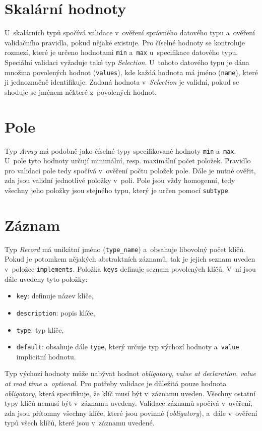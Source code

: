 \documentclass[FM,MP]{tulthesis}
\begin{document}
	\section{Skalární hodnoty}
		U~skalárních typů spočívá validace v~ověření správného datového typu a~ověření validačního pravidla, pokud nějaké existuje. Pro číselné hodnoty se kontroluje rozmezí, které je určeno hodnotami \texttt{min} a~\texttt{max} u~specifikace datového typu. Speciální validaci vyžaduje také typ \textit{Selection}. U~tohoto datového typu je dána množina povolených hodnot (\texttt{values}), kde každá hodnota má jméno (\texttt{name}), které ji jednoznačně identifikuje. Zadaná hodnota v~\textit{Selection} je validní, pokud se shoduje se jménem některé z~povolených hodnot.

	\section{Pole}
		Typ \textit{Array} má podobně jako číselné typy specifikované hodnoty \texttt{min} a~\texttt{max}. U~pole tyto hodnoty určují minimální, resp. maximální počet položek. Pravidlo pro validaci pole tedy spočívá v~ověření počtu položek pole. Dále je nutné ověřit, zda jsou validní jednotlivé položky v~poli. Pole jsou vždy homogenní, tedy všechny jeho položky jsou stejného typu, který je určen pomocí \texttt{subtype}.

	\section{Záznam}
		\label{struktura-zaznam}
		Typ \textit{Record} má unikátní jméno (\texttt{type\_name}) a~obsahuje libovolný počet klíčů. Pokud je potomkem nějakých abstraktních záznamů, tak je jejich seznam uveden v~položce \texttt{implements}. Položka \texttt{keys} definuje seznam povolených klíčů. V~ní jsou dále uvedeny tyto položky:
		\begin{itemize}
			\item \texttt{key}: definuje název klíče,
			\item \texttt{description}: popis klíče,
			\item \texttt{type}: typ klíče,
			\item \texttt{default}: obsahuje dále \texttt{type}, který určuje typ výchozí hodnoty a~\texttt{value} implicitní hodnotu.
		\end{itemize}

		Typ výchozí hodnoty může nabývat hodnot \textit{obligatory}, \textit{value at declaration}, \textit{value at read time} a~\textit{optional}. Pro potřeby validace je důležitá pouze hodnota \textit{obligatory}, která specifikuje, že klíč musí být v~záznamu uveden. Všechny ostatní typy klíčů nemusí být v~záznamu uvedeny. Validace záznamů spočívá v~ověření, zda jsou přítomny všechny klíče, které jsou povinné (\textit{obligatory}), a~dále v~ověření typů všech klíčů, které jsou v~záznamu uvedené.
\end{document}
